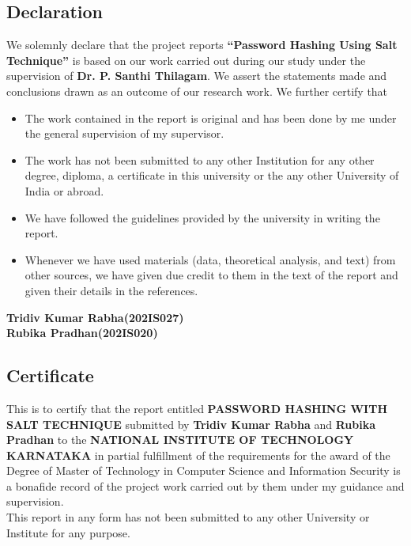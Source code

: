 \documentclass{article}[12pt,a4paper]
\begin{document}
\newpage
\begin{center}
\section*{Declaration}
\end{center}

\vspace{2em}
We solemnly declare that the project reports \textbf{“Password Hashing Using Salt Technique”} is based on our work carried out during our study under the supervision of \textbf{Dr. P. Santhi Thilagam}.
We assert the statements made and conclusions drawn as an outcome of our research work. We further certify that
\begin{itemize}
\item The work contained in the report is original and has been done by me under the general supervision of my supervisor.
\item The work has not been submitted to any other Institution for any other degree, diploma, a certificate in this university or the any other University of India or abroad.
\item We have followed the guidelines provided by the university in writing the report.
\item Whenever we have used materials (data, theoretical analysis, and text) from other sources, we have given due credit to them in the text of the report and given their details in the references.
\end{itemize}
\vspace{33em}
\textbf{Tridiv Kumar Rabha(202IS027)}\\
\textbf{Rubika Pradhan(202IS020)}
\newpage
\begin{center}
\section*{Certificate}    
\end{center}
\vspace{2em}
This is to certify that the report entitled \textbf{PASSWORD HASHING WITH SALT TECHNIQUE} submitted by \textbf{Tridiv Kumar Rabha} and \textbf{Rubika Pradhan} to the \textbf{NATIONAL INSTITUTE OF TECHNOLOGY KARNATAKA} in partial fulfillment of the requirements for the award of the Degree of Master of Technology in Computer Science and Information Security is a bonafide record of the project work carried out by them under my guidance and supervision.\\
This report in any form has not been submitted to any other University or Institute for any purpose.\\
\end{document}
